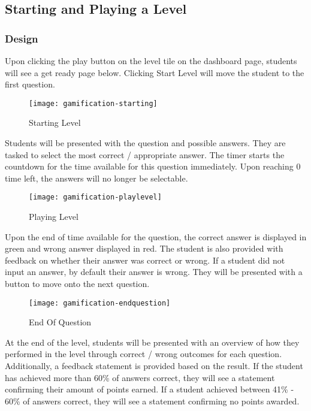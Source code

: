 \newpage

\subsection{Starting and Playing a Level}
\subsubsection{Design}
Upon clicking the play button on the level tile on the dashboard page, students will see a get ready page below. Clicking Start Level will move the student to the first question.

\begin{figure}[h!]
    \texttt{[image: gamification-starting]}
    \centering
    \caption{Starting Level}
\end{figure}

Students will be presented with the question and possible answers. They are tasked to select the most correct / appropriate answer. The timer starts the countdown for the time available for this question immediately. Upon reaching 0 time left, the answers will no longer be selectable.

\begin{figure}[h!]
    \texttt{[image: gamification-playlevel]}
    \centering
    \caption{Playing Level}
\end{figure}

\newpage

Upon the end of time available for the question, the correct answer is displayed in green and wrong answer displayed in red. The student is also provided with feedback on whether their answer was correct or wrong. If a student did not input an answer, by default their answer is wrong. 
They will be presented with a button to move onto the next question.

\begin{figure}[h!]
    \texttt{[image: gamification-endquestion]}
    \centering
    \caption{End Of Question}
\end{figure}

At the end of the level, students will be presented with an overview of how they performed in the level through correct / wrong outcomes for each question. Additionally, a feedback statement is provided based on the result. If the student has achieved more than 60\% of answers correct, they will see a statement confirming their amount of points earned. If a student achieved between  41\% - 60\% of answers correct, they will see a statement confirming no points awarded. 

